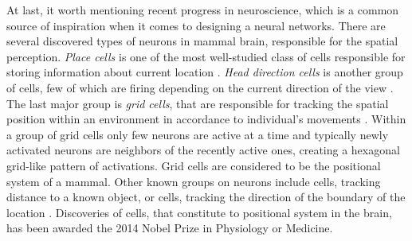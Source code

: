 At last, it worth mentioning recent progress in neuroscience, which is a common source of inspiration when it comes to designing a neural networks.
There are several discovered types of neurons in mammal brain, responsible for the spatial perception.
\textit{Place cells} is one of the most well-studied class of cells responsible for storing information about current location \cite{Fenton2009, Hartley2014}.
\textit{Head direction cells} is another group of cells, few of which are firing depending on the current direction of the view \cite{Taube1990, Taube1990a}.
The last major group is \textit{grid cells}, that are responsible for tracking the spatial position within an environment in accordance to individual's movements \cite{Moser2008}.
Within a group of grid cells only few neurons are active at a time and typically newly activated neurons are neighbors of the recently active ones, creating a hexagonal grid-like pattern of activations.
Grid cells are considered to be the positional system of a mammal.
Other known groups on neurons include cells, tracking distance to a known object, or cells, tracking the direction of the boundary of the location \cite{Lever2009}.
Discoveries of cells, that constitute to positional system in the brain, has been awarded the 2014 Nobel Prize in Physiology or Medicine.
